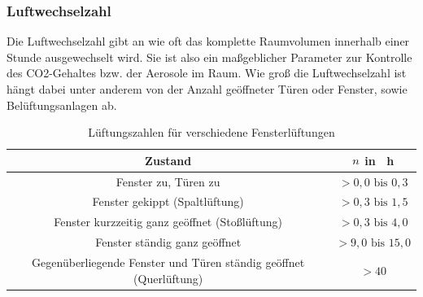 \subsubsection*{Luftwechselzahl}
Die Luftwechselzahl gibt an wie oft das komplette Raumvolumen innerhalb einer Stunde ausgewechselt wird. Sie ist also ein maßgeblicher Parameter zur Kontrolle des CO2-Gehaltes bzw. der Aerosole im Raum. Wie groß die Luftwechselzahl ist hängt dabei unter anderem von der Anzahl geöffneter Türen oder Fenster, sowie Belüftungsanlagen ab.

\begin{table}[h!]
	\renewcommand*{\arraystretch}{1.2}
	\centering
	\caption{Lüftungszahlen für verschiedene Fensterlüftungen \cite{Bosy.17.10.2020}}
	\label{tab:lueftungen}
	\begin{tabulary}{1.0\textwidth}{C|C}
		\hline
		\textbf{Zustand} 	& \textbf{$\boldmath n$ in \si{\per \hour}}\\
		\hline
		Fenster zu, Türen zu 												& $> 0,0 \text{ bis } 0,3$\\
		Fenster gekippt (Spaltlüftung)  						& $> 0,3 \text{ bis } 1,5$\\
		Fenster kurzzeitig ganz geöffnet (Stoßlüftung) & $> 0,3 \text{ bis } 4,0$\\
		Fenster ständig ganz geöffnet & $> 9,0 \text{ bis } 15,0$\\
		Gegenüberliegende Fenster und Türen ständig geöffnet (Querlüftung) & $> 40$\\
		\hline			
	\end{tabulary}
\end{table}
\FloatBarrier
	
